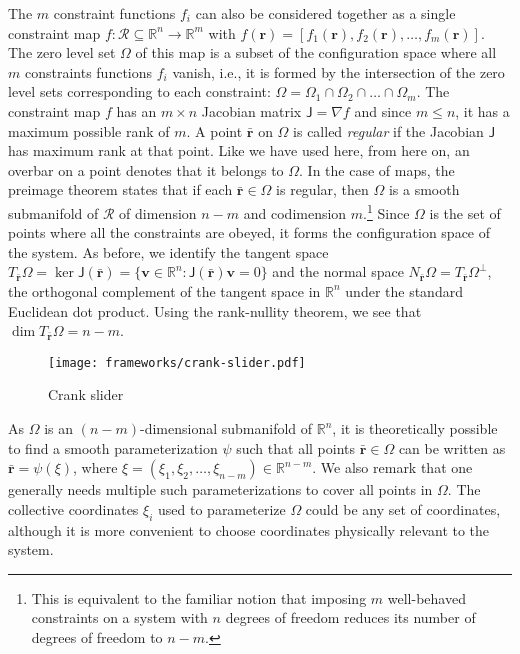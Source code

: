 The $m$ constraint functions $f_i$ can also be considered together as a single constraint map $f: \mathscr{R} \subseteq \mathbb{R}^n \to \mathbb{R}^m$ with $f(\bm{r}) = [f_1(\bm{r}), f_2(\bm{r}), \dots, f_m(\bm{r})]$.
The zero level set $\Omega$ of this map is a subset of the configuration space where all $m$ constraints functions $f_i$ vanish, i.e., it is formed by the intersection of the zero level sets corresponding to each constraint: $\Omega = \Omega_1 \cap \Omega_2 \cap \dots \cap \Omega_m$.
The constraint map $f$ has an $m\times n$ Jacobian matrix $\mathsf{J} = \nabla f$ and since $m\leq n$, it has a maximum possible rank of $m$.
A point $\bar{\bm{r}}$ on $\Omega$ is called \emph{regular} if the Jacobian $\mathsf{J}$ has maximum rank at that point.
Like we have used here, from here on, an overbar on a point denotes that it belongs to $\Omega$.
In the case of maps, the preimage theorem states that if each $\bar{\bm{r}} \in \Omega$ is regular, then $\Omega$ is a smooth submanifold of $\mathscr{R}$ of dimension $n - m$ and codimension $m$.\footnote{This is equivalent to the familiar notion that imposing $m$ well-behaved constraints on a system with $n$ degrees of freedom reduces its number of degrees of freedom to $n-m$.}
Since $\Omega$ is the set of points where all the constraints are obeyed, it forms the configuration space of the system.
As before, we identify the tangent space $T_{\bar{\bm{r}}}\Omega = \ker{\mathsf{J}(\bar{\bm{r}})} = \{\bm{v} \in \mathbb{R}^n: \mathsf{J}(\bar{\bm{r}})\bm{v} = 0\}$ and the normal space $N_{\bar{\bm{r}}}\Omega = T_{\bar{\bm{r}}}\Omega^\perp$, the orthogonal complement of the tangent space in $\mathbb{R}^n$ under the standard Euclidean dot product.
Using the rank-nullity theorem, we see that $\dim T_{\bar{\bm{r}}}\Omega = n-m$.
%
\begin{figure}
  \begin{center}
    \texttt{[image: frameworks/crank-slider.pdf]}
  \end{center}
    \caption{Crank slider}
  \label{fig:crankslider}
\end{figure}

As $\Omega$ is an $(n-m)$-dimensional submanifold of $\mathbb{R}^n$, it is theoretically possible to find a smooth parameterization $\psi$ such that all points $\bar{\bm{r}} \in \Omega$ can be written as $\bar{\bm{r}} = \psi(\xi)$, where $\xi = (\xi_1, \xi_2, \ldots, \xi_{n-m}) \in \mathbb{R}^{n-m}$.
We also remark that one generally needs multiple such parameterizations to cover all points in $\Omega$.
The collective coordinates $\xi_i$ used to parameterize $\Omega$ could be any set of coordinates, although it is more convenient to choose coordinates physically relevant to the system.

